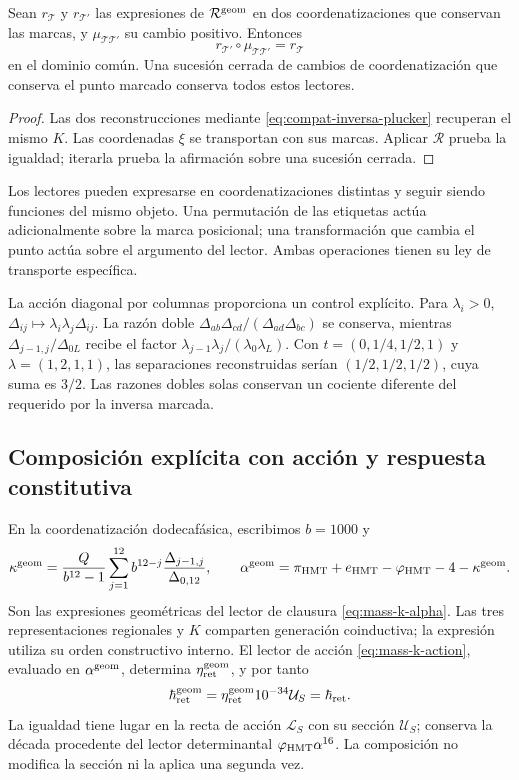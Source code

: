 \begin{corollary}
\label{cor:compat-mutaciones}
Sean \(r_{\mathcal T}\) y \(r_{\mathcal T'}\) las expresiones
de \(\mathcal R^{\rm geom}\) en dos coordenatizaciones que conservan las marcas,
y \(\mu_{\mathcal T\mathcal T'}\) su cambio positivo. Entonces
\[
 r_{\mathcal T'}\circ\mu_{\mathcal T\mathcal T'}
 =r_{\mathcal T}
\]
en el dominio común. Una sucesión cerrada de cambios de coordenatización que
conserva el punto marcado conserva todos estos lectores.
\end{corollary}
\begin{proof}
Las dos reconstrucciones mediante
\eqref{eq:compat-inversa-plucker} recuperan el mismo \(K\).
Las coordenadas \(\xi\) se transportan con sus marcas. Aplicar
\(\mathcal R\) prueba la igualdad; iterarla prueba la afirmación
sobre una sucesión cerrada.
\end{proof}

Los lectores pueden expresarse en coordenatizaciones distintas y seguir siendo
funciones del mismo objeto. Una permutación de las etiquetas actúa
adicionalmente sobre la marca posicional; una transformación que cambia
el punto actúa sobre el argumento del lector. Ambas operaciones tienen
su ley de transporte específica.

La acción diagonal por columnas proporciona un control explícito.
Para \(\lambda_i>0\),
\(\Delta_{ij}\mapsto\lambda_i\lambda_j\Delta_{ij}\).
La razón doble \(\Delta_{ab}\Delta_{cd}/
(\Delta_{ad}\Delta_{bc})\) se conserva, mientras
\(\Delta_{j-1,j}/\Delta_{0L}\) recibe el factor
\(\lambda_{j-1}\lambda_j/(\lambda_0\lambda_L)\).
Con \(t=(0,1/4,1/2,1)\) y \(\lambda=(1,2,1,1)\), las
separaciones reconstruidas serían \((1/2,1/2,1/2)\), cuya suma
es \(3/2\). Las razones dobles solas conservan un cociente diferente
del requerido por la inversa marcada.

\subsection{Composición explícita con acción y respuesta constitutiva}

En la coordenatización dodecafásica, escribimos \(b=1000\) y
\begin{equation}
 \kappa^{\rm geom}=
 \frac{Q}{b^{12}-1}\sum_{j=1}^{12}
 b^{12-j}\frac{\Delta_{j-1,j}}{\Delta_{0,12}},
 \qquad
 \alpha^{\rm geom}=\pi_{\rm HMT}+e_{\rm HMT}
 -\varphi_{\rm HMT}-4-\kappa^{\rm geom}.
 \label{eq:compat-alpha-geometrica}
\end{equation}
Son las expresiones geométricas del lector de clausura
\eqref{eq:mass-k-alpha}. Las tres representaciones regionales y \(K\)
comparten generación coinductiva; la expresión utiliza su orden
constructivo interno. El lector de acción
\eqref{eq:mass-k-action}, evaluado en \(\alpha^{\rm geom}\),
determina \(\eta_{\rm ret}^{\rm geom}\), y por tanto
\[
 \hbar_{\rm ret}^{\rm geom}
 =\eta_{\rm ret}^{\rm geom}10^{-34}\mathcal U_S
 =\hbar_{\rm ret}.
\]
La igualdad tiene lugar en la recta de acción \(\mathcal L_S\)
con su sección \(\mathcal U_S\); conserva la década procedente
del lector determinantal \(\varphi_{\rm HMT}\alpha^{16}\).
La composición no modifica la sección ni la aplica una segunda vez.

